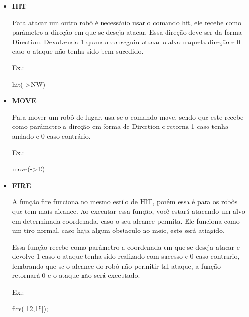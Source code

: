 \documentclass[a4paper]{article}
\begin{document}
{{{{{\begin{itemize}
        \item \textbf{HIT}
            
            Para atacar um outro robô é necessário 
            usar o comando
            \textcolor{NavyBlue}{hit},
            ele recebe como parâmetro a direção em
            que se deseja atacar. 
            Essa direção deve ser da forma Direction.
            Devolvendo 1 quando conseguiu atacar o
            alvo naquela direção e 0 caso o ataque
            não tenha sido bem sucedido.
            
            \textcolor{NavyBlue}{Ex.:}
            
            hit(->NW)

        \bigskip
        
        \item \textbf{MOVE}
            
            Para mover um robô de lugar, usa-se o comando
            \textcolor{NavyBlue}{move},
            sendo que este recebe como parâmetro a direção
            em forma de Direction e retorna 1 caso
            tenha andado e 0 caso contrário.
                
            \textcolor{NavyBlue}{Ex.:}

            move(->E)
            
        \bigskip

        \item \textbf{FIRE}
            
            A função 
            \textcolor{NavyBlue}{fire}
            funciona no mesmo estilo de HIT,
            porém essa é para os robôs que tem mais alcance.
            Ao executar essa função, você estará atacando um
            alvo em determinada coordenada, caso o seu alcance
            permita.
            Ele funciona como um tiro normal, caso haja algum
            obstaculo no meio, este será atingido.
            
            Essa função recebe como parâmetro a coordenada em
            que se deseja atacar e devolve 1 caso o ataque tenha
            sido realizado com sucesso e 0 caso contrário,
            lembrando que se o alcance do robô não permitir tal 
            ataque, a função retornará 0 e o ataque não será
            executado.
            
            \textcolor{NavyBlue}{Ex.:}
            
            fire([12,15]);

        \bigskip
        

\end{itemize}}}}}}
\end{document}
